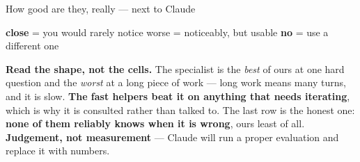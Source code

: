 \documentclass[aspectratio=169]{beamer}
\newcommand{\keybox}[1]{%
  \begin{center}
  \colorbox{black!8}{\parbox{0.92\textwidth}{\centering #1}}
  \end{center}}
\begin{document}
\begin{frame}{How good are they, really --- next to Claude}
\vspace{0.1em}
\begin{center}{\scriptsize \textcolor{green!40!black}{\textbf{close}} = you would rarely notice
\quad \textcolor{orange!70!black}{worse} = noticeably, but usable \quad
\textcolor{red!65!black}{\textbf{no}} = use a different one}\end{center}

\vspace{0.4em}
\keybox{\scriptsize \textbf{Read the shape, not the cells.} The specialist is the \emph{best} of
ours at one hard question and the \emph{worst} at a long piece of work --- long work means many
turns, and it is slow. \textbf{The fast helpers beat it on anything that needs iterating}, which is
why it is consulted rather than talked to. The last row is the honest one: \textbf{none of them
reliably knows when it is wrong}, ours least of all. \textbf{Judgement, not measurement} --- Claude
will run a proper evaluation and replace it with numbers.}

\end{frame}
\end{document}
